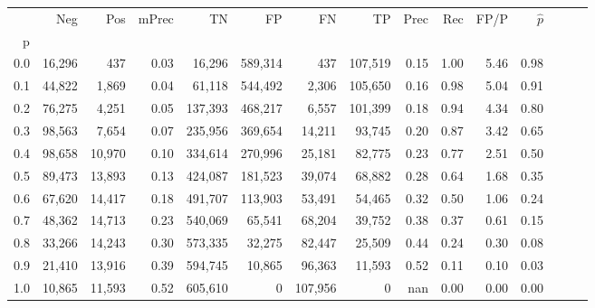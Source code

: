 \begin{tabular}{rrrrrrrrrrrrrrr}
\toprule
{} &     Neg &     Pos & mPrec &       TN &       FP &       FN &       TP &  Prec &   Rec &  FP/P & $\hat{p}$ \\
p   &         &         &       &          &          &          &          &       &       &       &           \\
\midrule
0.0 &  16,296 &     437 &  0.03 &   16,296 &  589,314 &      437 &  107,519 &  0.15 &  1.00 &  5.46 &      0.98 \\
0.1 &  44,822 &   1,869 &  0.04 &   61,118 &  544,492 &    2,306 &  105,650 &  0.16 &  0.98 &  5.04 &      0.91 \\
0.2 &  76,275 &   4,251 &  0.05 &  137,393 &  468,217 &    6,557 &  101,399 &  0.18 &  0.94 &  4.34 &      0.80 \\
0.3 &  98,563 &   7,654 &  0.07 &  235,956 &  369,654 &   14,211 &   93,745 &  0.20 &  0.87 &  3.42 &      0.65 \\
0.4 &  98,658 &  10,970 &  0.10 &  334,614 &  270,996 &   25,181 &   82,775 &  0.23 &  0.77 &  2.51 &      0.50 \\
0.5 &  89,473 &  13,893 &  0.13 &  424,087 &  181,523 &   39,074 &   68,882 &  0.28 &  0.64 &  1.68 &      0.35 \\
0.6 &  67,620 &  14,417 &  0.18 &  491,707 &  113,903 &   53,491 &   54,465 &  0.32 &  0.50 &  1.06 &      0.24 \\
0.7 &  48,362 &  14,713 &  0.23 &  540,069 &   65,541 &   68,204 &   39,752 &  0.38 &  0.37 &  0.61 &      0.15 \\
0.8 &  33,266 &  14,243 &  0.30 &  573,335 &   32,275 &   82,447 &   25,509 &  0.44 &  0.24 &  0.30 &      0.08 \\
0.9 &  21,410 &  13,916 &  0.39 &  594,745 &   10,865 &   96,363 &   11,593 &  0.52 &  0.11 &  0.10 &      0.03 \\
1.0 &  10,865 &  11,593 &  0.52 &  605,610 &        0 &  107,956 &        0 &   nan &  0.00 &  0.00 &      0.00 \\
\bottomrule
\end{tabular}
